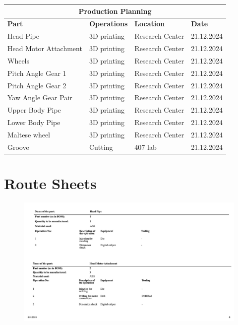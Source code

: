 \documentclass[12pt]{report}
\begin{document}
\begin{appendices}
\begin{center}
\begin{tabular}{|l|l|l|l|}
\hline
\multicolumn{4}{|c|}{\textbf{Production Planning}} \\ \hline
\textbf{Part}               & \textbf{Operations} & \textbf{Location} & \textbf{Date} \\ \hline
Head Pipe                  & 3D printing         & Research Center       & 21.12.2024    \\ \hline
Head Motor Attachment      & 3D printing         & Research Center       & 21.12.2024    \\ \hline
Wheels                     & 3D printing         & Research Center       & 21.12.2024    \\ \hline
Pitch Angle Gear 1         & 3D printing         & Research Center       & 21.12.2024    \\ \hline
Pitch Angle Gear 2         & 3D printing         & Research Center       & 21.12.2024    \\ \hline
Yaw Angle Gear Pair        & 3D printing         & Research Center       & 21.12.2024    \\ \hline
Upper Body Pipe            & 3D printing         & Research Center       & 21.12.2024    \\ \hline
Lower Body Pipe            & 3D printing         & Research Center       & 21.12.2024    \\ \hline
Maltese wheel              & 3D printing         & Research Center       & 21.12.2024    \\ \hline
Groove                     & Cutting             & 407 lab            & 21.12.2024          \\ \hline
\end{tabular}
\end{center}


\section{Route Sheets}

\begin{figure}[H]
    \centering
    \includegraphics[width=\textwidth]{Slide8.jpeg} 
    \label{fig:route-sheet}
\end{figure}


\end{appendices}
\end{document}
